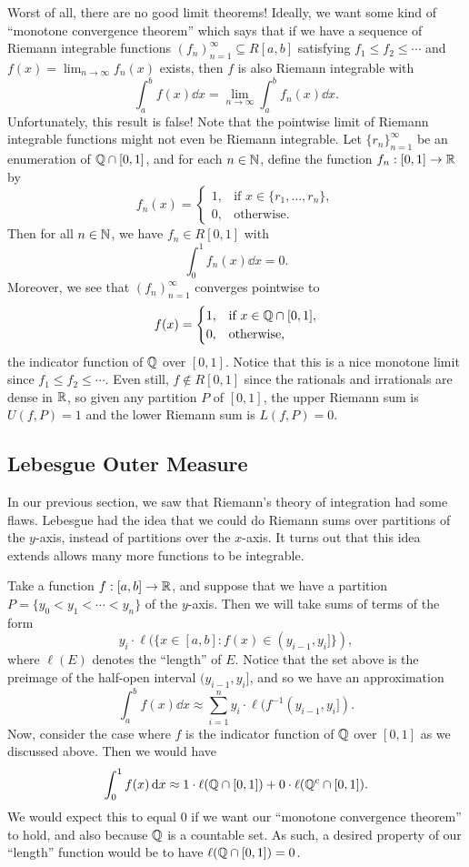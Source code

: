 Worst of all, there are no good limit theorems! Ideally, we want some kind of 
``monotone convergence theorem'' which says that if we have a sequence of 
Riemann integrable functions $(f_n)_{n=1}^\infty \subseteq R[a, b]$ satisfying 
$f_1 \leq f_2 \leq \cdots$ and $f(x) = 
\lim_{n\to\infty} f_n(x)$ exists, then $f$ is also Riemann integrable with 
\[ \int_a^b f(x)\dd x = \lim_{n\to\infty} \int_a^b f_n(x)\dd x. \] 
Unfortunately, this result is false! Note that the pointwise limit of Riemann 
integrable functions might not even be Riemann integrable. Let 
$\{r_n\}_{n=1}^\infty$ be an enumeration of $\mathbb{Q} \cap [0, 1]$, and for each 
$n \in \mathbb{N}$, define the function $f_n : [0, 1] \to \mathbb{R}$ by 
\[ f_n(x) = \begin{cases}
    1, & \text{if } x \in \{r_1, \dots, r_n\}, \\ 
    0, & \text{otherwise.} 
\end{cases} \] 
Then for all $n \in \mathbb{N}$, we have $f_n \in R[0, 1]$ with 
\[ \int_0^1 f_n(x)\dd x = 0. \] 
Moreover, we see that $(f_n)_{n=1}^\infty$ converges pointwise to 
\[ f(x) = \begin{cases} 
    1, & \text{if } x \in \mathbb{Q} \cap [0, 1], \\ 
    0, & \text{otherwise,} 
\end{cases} \] 
the indicator function of $\mathbb{Q}$ over $[0, 1]$. Notice that this is a nice 
monotone limit since $f_1 \leq f_2 \leq \cdots$. Even still, $f \notin R[0, 1]$
since the rationals and irrationals are dense in $\mathbb{R}$, so given any 
partition $P$ of $[0, 1]$, the upper Riemann sum is $U(f, P) = 1$ and 
the lower Riemann sum is $L(f, P) = 0$. 

\subsection{Lebesgue Outer Measure}\label{subsec:2.2}
In our previous section, we saw that Riemann's theory of integration had 
some flaws. Lebesgue had the idea that we could do Riemann sums over 
partitions of the $y$-axis, instead of partitions over the $x$-axis. It turns 
out that this idea extends allows many more functions to be integrable. 

Take a function $f : [a, b] \to \mathbb{R}$, and suppose that we have a partition 
$P = \{y_0 < y_1 < \cdots < y_n\}$ of the $y$-axis. Then we will take sums of 
terms of the form 
\[ y_i \cdot \ell(\{x \in [a, b] : f(x) \in (y_{i-1}, y_i]\}), \] 
where $\ell(E)$ denotes the ``length'' of $E$. Notice that the set above 
is the preimage of the half-open interval $(y_{i-1}, y_i]$, and so we have an 
approximation 
\[ \int_a^b f(x)\dd x \approx \sum_{i=1}^n y_i \cdot \ell(f^{-1}(y_{i-1}, y_i]). \] 
Now, consider the case where $f$ is the indicator function of $\mathbb{Q}$ over 
$[0, 1]$ as we discussed above. Then we would have 
\[ \int_0^1 f(x)\,\mathrm{d} x \approx 1 \cdot \ell(\mathbb{Q} \cap [0, 1]) + 0 \cdot 
\ell(\mathbb{Q}^c \cap [0, 1]). \] 
We would expect this to equal $0$ if we want our ``monotone convergence theorem''
to hold, and also because $\mathbb{Q}$ is a countable set. As such, a desired property 
of our ``length'' function would be to have $\ell(\mathbb{Q} \cap [0, 1]) = 0$. 

